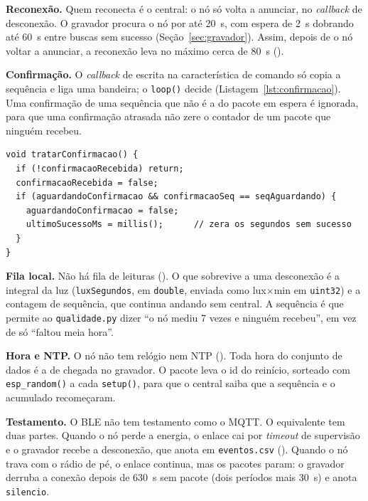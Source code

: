 \noindent\textbf{Reconexão.} Quem reconecta é o central: o nó só volta a
anunciar, no \emph{callback} de desconexão. O gravador procura o nó por
até \SI{20}{\second}, com espera de \SI{2}{\second} dobrando até
\SI{60}{\second} entre buscas sem sucesso (Seção~\ref{sec:gravador}).
Assim, depois de o nó voltar a anunciar, a reconexão leva no máximo cerca
de \SI{80}{\second} ().

\noindent\textbf{Confirmação.} O \emph{callback} de escrita na característica de
comando só copia a sequência e liga uma bandeira; o \texttt{loop()} decide
(Listagem~\ref{lst:confirmacao}). Uma confirmação de uma sequência que não
é a do pacote em espera é ignorada, para que uma confirmação atrasada não
zere o contador de um pacote que ninguém recebeu.

\begin{lstlisting}[style=arduino,
  caption={Só a confirmação do pacote em espera conta como sucesso},
  label={lst:confirmacao}]
void tratarConfirmacao() {
  if (!confirmacaoRecebida) return;
  confirmacaoRecebida = false;
  if (aguardandoConfirmacao && confirmacaoSeq == seqAguardando) {
    aguardandoConfirmacao = false;
    ultimoSucessoMs = millis();      // zera os segundos sem sucesso
  }
}
\end{lstlisting}

\noindent\textbf{Fila local.} Não há fila de leituras (). O que sobrevive a
uma desconexão é a integral da luz (\texttt{luxSegundos}, em
\texttt{double}, enviada como lux$\times$min em \texttt{uint32}) e a
contagem de sequência, que continua andando sem central. A sequência é que
permite ao \texttt{qualidade.py} dizer \enquote{o nó mediu 7 vezes e
ninguém recebeu}, em vez de só \enquote{faltou meia hora}.

\noindent\textbf{Hora e NTP.} O nó não tem relógio nem NTP (). Toda hora do
conjunto de dados é a de chegada no gravador. O pacote leva o id do
reinício, sorteado com \texttt{esp\_random()} a cada \texttt{setup()},
para que o central saiba que a sequência e o acumulado recomeçaram.

\noindent\textbf{Testamento.} O BLE não tem testamento como o MQTT. O equivalente
tem duas partes. Quando o nó perde a energia, o enlace cai por
\emph{timeout} de supervisão e o gravador recebe a desconexão, que anota em
\texttt{eventos.csv} (). Quando o nó trava com o rádio de pé, o
enlace continua, mas os pacotes param: o gravador derruba a conexão depois
de \SI{630}{\second} sem pacote (dois períodos mais \SI{30}{\second}) e
anota \texttt{silencio}.

